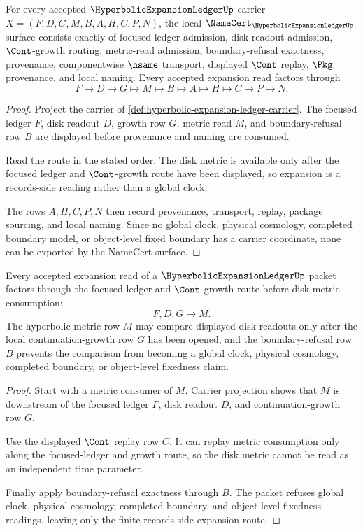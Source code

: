 \begin{theorem}
\label{thm:hyperbolic-expansion-ledger-namecert-obligations}
For every accepted $\HyperbolicExpansionLedgerUp$ carrier $X=(F,D,G,M,B,A,H,C,P,N)$, the local $\NameCert_{\HyperbolicExpansionLedgerUp}$ surface consists exactly of focused-ledger admission, disk-readout admission, $\Cont$-growth routing, metric-read admission, boundary-refusal exactness, provenance, componentwise $\hsame$ transport, displayed $\Cont$ replay, $\Pkg$ provenance, and local naming. Every accepted expansion read factors through
$$
F\longmapsto D\longmapsto G\longmapsto M\longmapsto B\longmapsto A\longmapsto H\longmapsto C\longmapsto P\longmapsto N.
$$
\end{theorem}
\begin{proof}
Project the carrier of \autoref{def:hyperbolic-expansion-ledger-carrier}. The focused ledger $F$, disk readout $D$, growth row $G$, metric read $M$, and boundary-refusal row $B$ are displayed before provenance and naming are consumed.

Read the route in the stated order. The disk metric is available only after the focused ledger and $\Cont$-growth route have been displayed, so expansion is a records-side reading rather than a global clock.

The rows $A,H,C,P,N$ then record provenance, transport, replay, package sourcing, and local naming. Since no global clock, physical cosmology, completed boundary model, or object-level fixed boundary has a carrier coordinate, none can be exported by the NameCert surface.
\end{proof}

\begin{theorem}
\label{thm:hyperbolic-expansion-ledger-cont-growth-route}
Every accepted expansion read of a $\HyperbolicExpansionLedgerUp$ packet factors through the focused ledger and $\Cont$-growth route before disk metric consumption:
$$
F,D,G\longmapsto M.
$$
The hyperbolic metric row $M$ may compare displayed disk readouts only after the local continuation-growth row $G$ has been opened, and the boundary-refusal row $B$ prevents the comparison from becoming a global clock, physical cosmology, completed boundary, or object-level fixedness claim.
\end{theorem}
\begin{proof}
Start with a metric consumer of $M$. Carrier projection shows that $M$ is downstream of the focused ledger $F$, disk readout $D$, and continuation-growth row $G$.

Use the displayed $\Cont$ replay row $C$. It can replay metric consumption only along the focused-ledger and growth route, so the disk metric cannot be read as an independent time parameter.

Finally apply boundary-refusal exactness through $B$. The packet refuses global clock, physical cosmology, completed boundary, and object-level fixedness readings, leaving only the finite records-side expansion route.
\end{proof}


